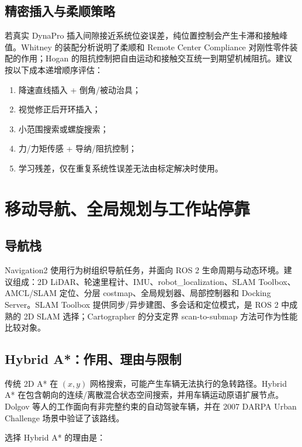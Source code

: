 \documentclass[UTF8,12pt,oneside]{ctexrep}
\begin{document}
\section{精密插入与柔顺策略}

若真实 DynaPro 插入间隙接近系统位姿误差，纯位置控制会产生卡滞和接触峰值。Whitney 的装配分析说明了柔顺和 Remote Center Compliance 对刚性零件装配的作用\cite{whitney1982assembly}；Hogan 的阻抗控制把自由运动和接触交互统一到期望机械阻抗\cite{hogan1985impedance}。建议按以下成本递增顺序评估：

\begin{enumerate}
  \item 降速直线插入 + 倒角/被动治具；
  \item 视觉修正后开环插入；
  \item 小范围搜索或螺旋搜索；
  \item 力/力矩传感 + 导纳/阻抗控制；
  \item 学习残差，仅在重复系统性误差无法由标定解决时使用。
\end{enumerate}

\chapter{移动导航、全局规划与工作站停靠}

\section{导航栈}

Navigation2 使用行为树组织导航任务，并面向 ROS 2 生命周期与动态环境\cite{macenski2020nav2}。建议组成：2D LiDAR、轮速里程计、IMU、robot\_localization、SLAM Toolbox、AMCL/SLAM 定位、分层 costmap、全局规划器、局部控制器和 Docking Server。SLAM Toolbox 提供同步/异步建图、多会话和定位模式，是 ROS 2 中成熟的 2D SLAM 选择\cite{macenski2021slamtoolbox}；Cartographer 的分支定界 scan-to-submap 方法可作为性能比较对象\cite{hess2016cartographer}。

\section{Hybrid A*：作用、理由与限制}

传统 2D A* 在 $(x,y)$ 网格搜索，可能产生车辆无法执行的急转路径。Hybrid A* 在包含朝向的连续/离散混合状态空间搜索，并用车辆运动原语扩展节点。Dolgov 等人的工作面向有非完整约束的自动驾驶车辆，并在 2007 DARPA Urban Challenge 场景中验证了该路线\cite{dolgov2008hybridastar}。

选择 Hybrid A* 的理由是：
\end{document}
